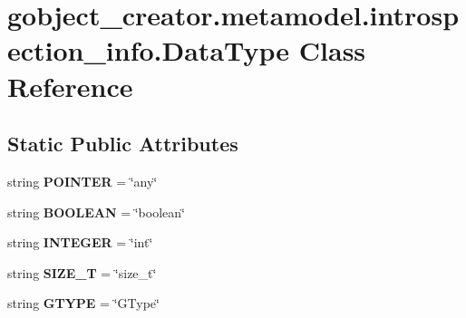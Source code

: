 \hypertarget{classgobject__creator_1_1metamodel_1_1introspection__info_1_1DataType}{
\section{gobject\_\-creator.metamodel.introspection\_\-info.DataType Class Reference}
\label{classgobject__creator_1_1metamodel_1_1introspection__info_1_1DataType}
}
\subsection*{Static Public Attributes}
\begin{DoxyCompactItemize}
\item 
\hypertarget{classgobject__creator_1_1metamodel_1_1introspection__info_1_1DataType_ab5a332b639d78c5b6481da0df9731fbe}{
string {\bfseries POINTER} = \char`\"{}any\char`\"{}}
\label{classgobject__creator_1_1metamodel_1_1introspection__info_1_1DataType_ab5a332b639d78c5b6481da0df9731fbe}

\item 
\hypertarget{classgobject__creator_1_1metamodel_1_1introspection__info_1_1DataType_a44e05819bbecb449367100640136b597}{
string {\bfseries BOOLEAN} = \char`\"{}boolean\char`\"{}}
\label{classgobject__creator_1_1metamodel_1_1introspection__info_1_1DataType_a44e05819bbecb449367100640136b597}

\item 
\hypertarget{classgobject__creator_1_1metamodel_1_1introspection__info_1_1DataType_a2b7803541655791dd56375cbb8902b5f}{
string {\bfseries INTEGER} = \char`\"{}int\char`\"{}}
\label{classgobject__creator_1_1metamodel_1_1introspection__info_1_1DataType_a2b7803541655791dd56375cbb8902b5f}

\item 
\hypertarget{classgobject__creator_1_1metamodel_1_1introspection__info_1_1DataType_ad092c1201d2724d782bfa6ac2f4d1c7c}{
string {\bfseries SIZE\_\-T} = \char`\"{}size\_\-t\char`\"{}}
\label{classgobject__creator_1_1metamodel_1_1introspection__info_1_1DataType_ad092c1201d2724d782bfa6ac2f4d1c7c}

\item 
\hypertarget{classgobject__creator_1_1metamodel_1_1introspection__info_1_1DataType_aa2b6febb08c038c5318f1f63b2d68ec2}{
string {\bfseries GTYPE} = \char`\"{}GType\char`\"{}}
\label{classgobject__creator_1_1metamodel_1_1introspection__info_1_1DataType_aa2b6febb08c038c5318f1f63b2d68ec2}


\end{DoxyCompactItemize}
